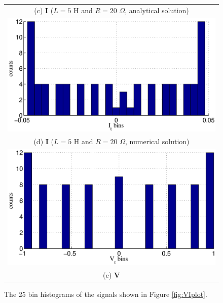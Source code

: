 {\begin{center}
\begin{figure}[h]
\begin{center}
\begin{tabular}{c}
(c) $\mathbf{I}$ ($L=5$ H and $R=20$ $\Omega$, analytical solution) \\ 
\includegraphics[scale=0.35]{IRCircuitResponseExampleL5R20_Yhist_num.eps} \\
(d) $\mathbf{I}$ ($L=5$ H and $R=20$ $\Omega$, numerical solution)\\
\includegraphics[scale=0.35]{IRCircuitResponseExampleL10R5_Xhist.eps} \\
(c) $\mathbf{V}$
\end{tabular}
\end{center}
\caption[The 25 bin histograms of the signals]{The 25 bin histograms of the signals shown in Figure \ref{fig:VIplot}.}
\label{fig:VIhist}
\end{figure}
\end{center}
\vspace*{\fill}
\clearpage
}

